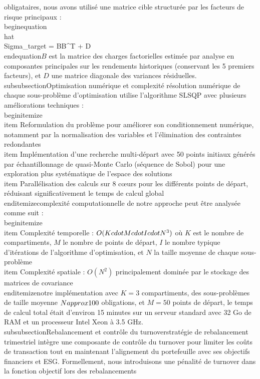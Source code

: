 obligataires, nous avons utilisé une matrice cible structurée par les facteurs de risque principaux :\n\n\\begin{equation}\n\\hat{\\Sigma}_{target} = BB^T + D\n\\end{equation}\n{} $B$ est la matrice des charges factorielles estimée par analyse en composantes principales sur les rendements historiques (conservant les 5 premiers facteurs), et $D$ une matrice diagonale des variances résiduelles.\n\n\\subsubsection{Optimisation numérique et complexité}  \n\nLa résolution numérique de chaque sous-problème d'optimisation utilise l'algorithme SLSQP avec plusieurs améliorations techniques :\n\n\\begin{itemize}\n    \\item Reformulation du problème pour améliorer son conditionnement numérique, notamment par la normalisation des variables et l'élimination des contraintes redondantes\n    \n    \\item Implémentation d'une recherche multi-départ avec 50 points initiaux générés par échantillonnage de quasi-Monte Carlo (séquence de Sobol) pour une exploration plus systématique de l'espace des solutions\n    \n    \\item Parallélisation des calculs sur 8 cœurs pour les différents points de départ, réduisant significativement le temps de calcul global\n\\end{itemize}\n\nLa complexité computationnelle de notre approche peut être analysée comme suit :\n\n\\begin{itemize}\n    \\item Complexité temporelle : $O(K \\cdot M \\cdot I \\cdot N^3)$ où $K$ est le nombre de compartiments, $M$ le nombre de points de départ, $I$ le nombre typique d'itérations de l'algorithme d'optimisation, et $N$ la taille moyenne de chaque sous-problème\n    \n    \\item Complexité spatiale : $O(N^2)$ principalement dominée par le stockage des matrices de covariance\n\\end{itemize}\n\nPour notre implémentation avec $K=3$ compartiments, des sous-problèmes de taille moyenne $N \\approx 100$ obligations, et $M=50$ points de départ, le temps de calcul total était d'environ 15 minutes sur un serveur standard avec 32 Go de RAM et un processeur Intel Xeon à 3.5 GHz.\n\n\\subsubsection{Rebalancement et contrôle du turnover}\n\nNotre stratégie de rebalancement trimestriel intègre une composante de contrôle du turnover pour limiter les coûts de transaction tout en maintenant l'alignement du portefeuille avec ses objectifs financiers et ESG. Formellement, nous introduisons une pénalité de turnover dans la fonction objectif lors des rebalancements 
